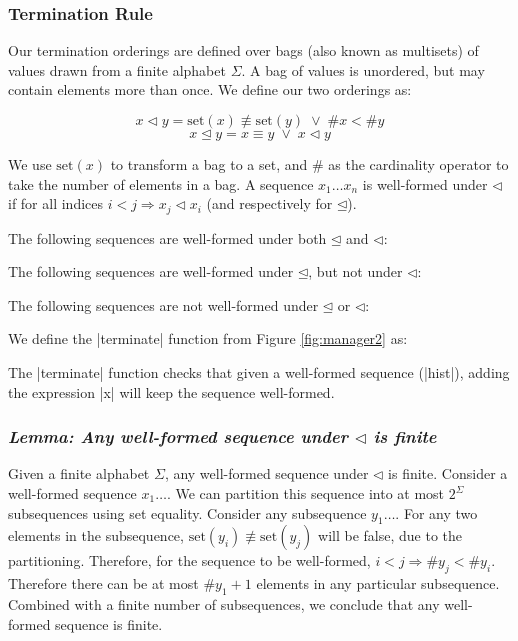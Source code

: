 \documentclass[draft]{sigplanconf}
\newcommand{\lemma}[1]{\subsubsection*{\textit{Lemma: #1}}}
\newcommand{\set}{\mathrm{set}}
\newcommand{\veeskip}{\;\vee\;}
\begin{document}
\subsubsection{Termination Rule}
\label{sec:term_rule}

Our termination orderings are defined over bags (also known as multisets) of values drawn from a finite alphabet $\Sigma$. A bag of values is unordered, but may contain elements more than once. We define our two orderings as:

\[
x \lhd y = \set(x) \not\equiv \set(y)  \veeskip \# x < \# y
\]
\[
x \unlhd y = x \equiv y \veeskip x \lhd y
\]

We use $\set(x)$ to transform a bag to a set, and $\#$ as the cardinality operator to take the number of elements in a bag. A sequence $x_1 \ldots x_n$ is well-formed under $\lhd$ if for all indices $i < j \Rightarrow x_j \lhd x_i$ (and respectively for $\unlhd$).

The following sequences are well-formed under both $\unlhd$ and $\lhd$:

\begin{code}
\end{code}

The following sequences are well-formed under $\unlhd$, but not under $\lhd$:

\begin{code}
\end{code}

The following sequences are not well-formed under $\unlhd$ or $\lhd$:

\begin{code}
\end{code}

We define the |terminate| function from Figure \ref{fig:manager2} as:


The |terminate| function checks that given a well-formed sequence (|hist|), adding the expression |x| will keep the sequence well-formed.

\lemma{Any well-formed sequence under $\lhd$ is finite}

Given a finite alphabet $\Sigma$, any well-formed sequence under $\lhd$ is finite. Consider a well-formed sequence $x_1\ldots$. We can partition this sequence into at most $2^\Sigma$ subsequences using set equality. Consider any subsequence $y_1\ldots$. For any two elements in the subsequence, $\set(y_i) \not\equiv \set(y_j)$ will be false, due to the partitioning. Therefore, for the sequence to be well-formed, $i < j \Rightarrow \# y_j < \# y_i$. Therefore there can be at most $\#y_1+1$ elements in any particular subsequence. Combined with a finite number of subsequences, we conclude that any well-formed sequence is finite.
\end{document}
